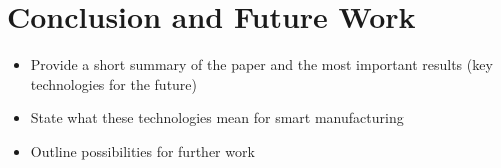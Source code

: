 \section{Conclusion and Future Work}\label{sec:conclusions}

\begin{itemize}
\item Provide a short summary of the paper and the most important results (key technologies for the future)
\item State what these technologies mean for smart manufacturing
\item Outline possibilities for further work
\end{itemize}